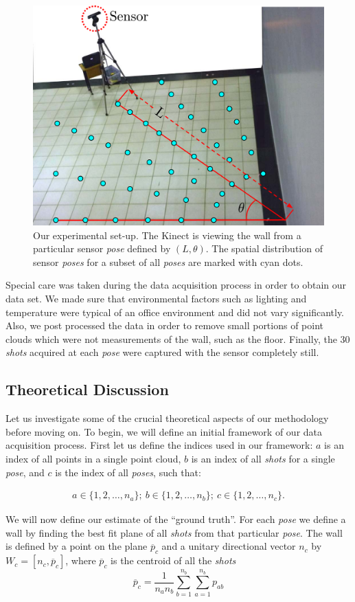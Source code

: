 \begin{figure}[h]
\centering
\includegraphics[width=.4\textwidth]{img/expSetup_markers.pdf}
\caption{
Our experimental set-up. The Kinect is viewing the wall from a particular sensor \emph{pose} defined by $(L,\theta)$. The spatial distribution of sensor \emph{poses} for a subset of all \emph{poses} are marked with cyan dots.
}
\label{fig:exp_setup}
\end{figure} 

Special care was taken during the data acquisition process in order to obtain our data set. We made sure that environmental factors such as lighting and temperature were typical of an office environment and did not vary significantly. Also, we post processed the data in order to remove small portions of point clouds which were not measurements of the wall, such as the floor. Finally, the 30 \emph{shots} acquired at each \emph{pose} were captured with the sensor completely still.

\subsection{Theoretical Discussion} 

Let us investigate some of the crucial theoretical aspects of our methodology before moving on. To begin, we will define an initial framework of our data acquisition process. First let us define the indices used in our framework: $a$ is an index of all points in a single point cloud, $b$ is an index of all \emph{shots} for a single \emph{pose}, and $c$ is the index of all \emph{poses}, such that:

{\setlength\abovedisplayskip{-4pt} \setlength\belowdisplayskip{-4pt} %
\begin{gather*}
a \in \{1,2,\dots,n_a\};\ b \in \{1,2,\dots,n_b\};\ c \in \{1,2,\dots,n_c\}.
\end{gather*}
} 

\noindent We will now define our estimate of the ``ground truth''. For each \emph{pose} we define a wall by finding the best fit plane of all \emph{shots} from that particular \emph{pose}. The wall is defined by a point on the plane $\overline{p}_c$ and a unitary directional vector $n_c$ by $W_c = [n_c, \overline{p}_c]$, where $\overline{p}_c$ is the centroid of all the \emph{shots}
{
\setlength\abovedisplayskip{4pt} \setlength\belowdisplayskip{2pt} %
\begin{equation} 
\overline{p}_c=\frac{1}{n_an_b}\sum_{b=1}^{n_b}\sum_{a=1}^{n_b}p_{ab}  
\end{equation}
}

